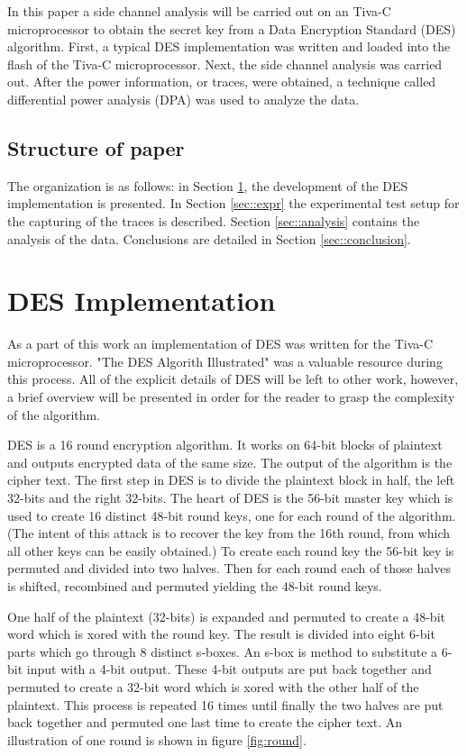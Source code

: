 	In this paper a side channel analysis will be carried out on an Tiva-C  microprocessor to obtain the secret key from a Data Encryption Standard (DES) algorithm.  First, a typical DES implementation was written and loaded into the flash of the Tiva-C microprocessor.  Next, the side channel analysis was carried out.  After the power information, or traces, were obtained, a technique called differential power analysis (DPA) was used to analyze the data.  \cite{des} \cite{Messerges}


\subsection{Structure of paper}
	The organization is as follows: in Section \ref{sec::des_impl}, the development of the DES implementation is presented.  In Section \ref{sec::expr} the experimental test setup for the capturing of the traces is described. Section \ref{sec::analysis} contains the analysis of the data.  Conclusions are detailed in Section \ref{sec::conclusion}. 


\section{DES Implementation} \label{sec::des_impl}
	As a part of this work an implementation of DES was written for the Tiva-C microprocessor.  "The DES Algorith Illustrated" was a valuable resource during this process.  All of the explicit details of DES will be left to other work, however, a brief overview will be presented in order for the reader to grasp the complexity of the algorithm. \cite{des}

	DES is a 16 round encryption algorithm.  It works on 64-bit blocks of plaintext and outputs encrypted data of the same size.  The output of the algorithm is the cipher text.  The first step in DES is to divide the plaintext block in half, the left 32-bits and the right 32-bits.  The heart of DES is the 56-bit master key which is used to create 16 distinct 48-bit round keys, one for each round of the algorithm.  (The intent of this attack is to recover the key from the 16th round, from which all other keys can be easily obtained.)  To create each round key the 56-bit key is permuted and divided into two halves.  Then for each round each of those halves is shifted, recombined and permuted yielding the 48-bit round keys.

	One half of the plaintext (32-bits) is expanded and permuted to create a 48-bit word which is xored with the round key.  The result is divided into eight 6-bit parts which go through 8 distinct s-boxes.  An s-box is  method to substitute a 6-bit input with a 4-bit output.  These 4-bit outputs are put back together and permuted to create a 32-bit word which is xored with the other half of the plaintext.  This process is repeated 16 times until finally the two halves are put back together and permuted one last time to create the cipher text.  An illustration of one round is shown in figure \ref{fig:round}.

